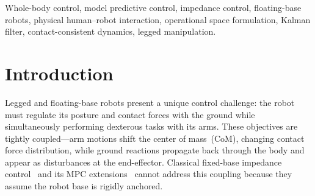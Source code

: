 \begin{abstract}
Floating-base robots must balance under rigid contact constraints while
interacting safely with humans.
Existing whole-body control~(WBC) frameworks allocate the full joint space
to locomotion or rely on fixed-gain impedance feedback that accumulates
steady-state error under sustained physical human--robot
interaction~(pHRI) forces.
This paper extends a recently proposed fixed-base two-layer Impedance MPC
to floating-base platforms through a three-level architecture: a centroidal
MPC plans contact forces over a 500\,ms horizon; a priority-driven WBC
layer resolves balance into joint torques through contact-consistent
null-space projection; and the residual null space is governed by a
receding-horizon quadratic program~(QP) that predicts and rejects pHRI
disturbances using a Kalman-augmented state.
A contact-consistent feedback linearization reduces the arm end-effector
plant to a double integrator with a \emph{constant} state matrix within
each contact mode, enabling offline precomputation of the QP cost and
${\geq}1$\,kHz operation.
A covariance-inflation protocol preserves the disturbance estimate across
contact-mode switches, guaranteeing zero steady-state error under bounded
constant pHRI loads, and an Impedance Equivalence Theorem shows the
infinite-horizon limit recovers a classical task-space impedance law whose
effective mass, damping, and stiffness adapt to posture and contact
configuration.
Simulations on a 17-DOF biped and the Unitree G1 humanoid validate the
design.
\end{abstract}

\begin{IEEEkeywords}
Whole-body control, model predictive control, impedance control,
floating-base robots, physical human--robot interaction, operational space
formulation, Kalman filter, contact-consistent dynamics, legged
manipulation.
\end{IEEEkeywords}

\section{Introduction}

Legged and floating-base robots present a unique control challenge: the
robot must regulate its posture and contact forces with the ground while
simultaneously performing dexterous tasks with its arms.
These objectives are tightly coupled---arm motions shift the center of
mass~(CoM), changing contact force distribution, while ground reactions
propagate back through the body and appear as disturbances at the
end-effector.
Classical fixed-base impedance control~\cite{hogan1985impedance} and its
MPC extensions~\cite{cao2023passive,cao2026impedance} cannot address this
coupling because they assume the robot base is rigidly anchored.

